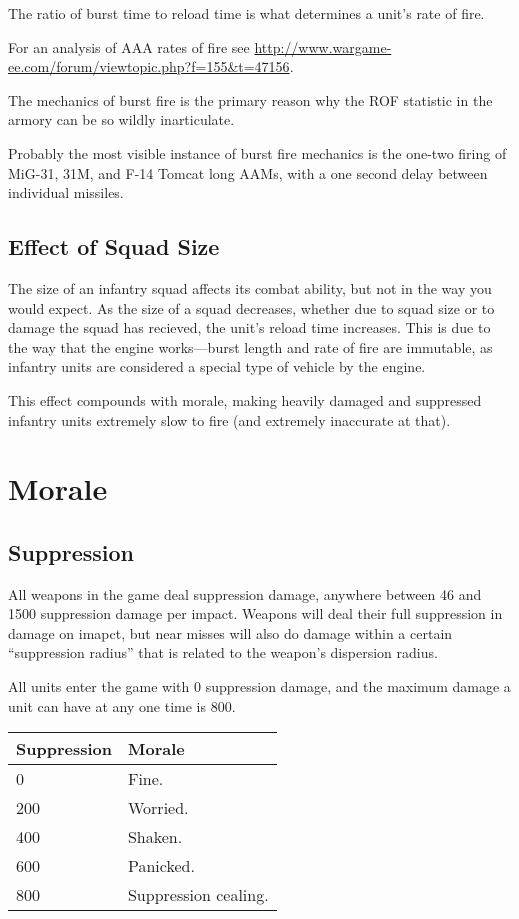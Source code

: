 \documentclass{article}
\begin{document}
The ratio of burst time to reload time is what determines a unit's rate of fire.

For an analysis of AAA rates of fire see
\url{http://www.wargame-ee.com/forum/viewtopic.php?f=155&t=47156}.

The mechanics of burst fire is the primary reason why the ROF statistic in the
armory can be so wildly inarticulate.

Probably the most visible instance of burst fire mechanics is the one-two firing
of MiG-31, 31M, and F-14 Tomcat long AAMs, with a one second delay between
individual missiles.

\subsection{Effect of Squad Size}

The size of an infantry squad affects its combat ability, but not in the way you
would expect. As the size of a squad decreases, whether due to squad size or to
damage the squad has recieved, the unit's reload time increases. This is
due to the way that the engine works---burst length and rate of fire are
immutable, as infantry units are considered a special type of vehicle by the
engine.

This effect compounds with morale, making heavily damaged and suppressed
infantry units extremely slow to fire (and extremely inaccurate at that).

\section{Morale}

\subsection{Suppression}

All weapons in the game deal suppression damage, anywhere between 46 and 1500
suppression damage per impact. Weapons will deal their full suppression
in damage on imapct, but near misses will also do damage within a certain
``suppression radius'' that is related to the weapon's dispersion
radius.

All units enter the game with 0 suppression damage, and the maximum damage a
unit can have at any one time is 800.

\begin{center}
    \begin{tabular}{ | l | l | }
    \hline
    Suppression & Morale \\ \hline
    0 & Fine. \\
    200 & Worried. \\
    400 & Shaken. \\
    600 & Panicked. \\
    800 & Suppression cealing. \\
    \hline
    \end{tabular}
\end{center}
\end{document}
